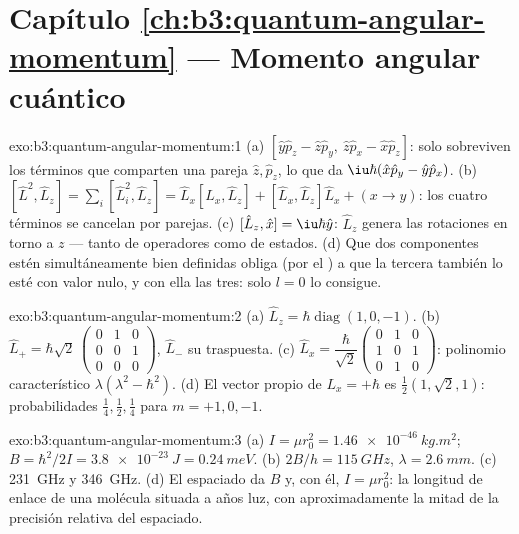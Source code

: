 \section*{Capítulo \ref{ch:b3:quantum-angular-momentum} --- Momento angular cuántico}

\begin{solution}{exo:b3:quantum-angular-momentum:1}
(a) $[\hat y\hat p_z - \hat z\hat p_y,\ \hat z\hat p_x - \hat x\hat
p_z]$: solo sobreviven los términos que comparten una pareja $\hat z, \hat p_z$,
lo que da $\iu\hbar(\hat x\hat p_y - \hat y\hat p_x)$. (b) $[\hat
L^2, \hat L_z] = \sum_i[\hat L_i^2, \hat L_z] = \hat L_x[\hat L_x,
\hat L_z] + [\hat L_x, \hat L_z]\hat L_x + (x \to y)$: los cuatro
términos se cancelan por parejas. (c) $[\hat L_z, \hat x] = \iu\hbar\hat y$:
$\hat L_z$ genera las rotaciones en torno a $z$ --- tanto de operadores como
de estados. (d) Que dos componentes estén simultáneamente bien definidas
obliga (por el ) a que la tercera también lo esté con valor nulo,
y con ella las tres: solo $l = 0$ lo consigue.
\end{solution}

\begin{solution}{exo:b3:quantum-angular-momentum:2}
(a) $\hat L_z = \hbar\operatorname{diag}(1, 0, -1)$. (b) $\hat L_+ =
\hbar\sqrt2\,\begin{pmatrix}0&1&0\\0&0&1\\0&0&0
\end{pmatrix}$, $\hat L_-$ su traspuesta. (c) $\hat L_x =
\dfrac{\hbar}{\sqrt2}\begin{pmatrix}0&1&0\\1&0&1\\0&1&0
\end{pmatrix}$: polinomio característico $\lambda(\lambda^2 -
\hbar^2)$. (d) El vector propio de $L_x = +\hbar$ es $\tfrac12(1,
\sqrt2, 1)$: probabilidades $\tfrac14, \tfrac12, \tfrac14$ para $m =
+1, 0, -1$.
\end{solution}

\begin{solution}{exo:b3:quantum-angular-momentum:3}
(a) $I = \mu r_0^2 = \qty{1.46e-46}{kg.m^2}$; $B = \hbar^2/2I =
\qty{3.8e-23}{J} = \qty{0.24}{meV}$. (b) $2B/h = \qty{115}{GHz}$,
$\lambda = \qty{2.6}{mm}$. (c) \qty{231}{GHz} y \qty{346}{GHz}.
(d) El espaciado da $B$ y, con él, $I = \mu r_0^2$: la longitud de enlace de
una molécula situada a años luz, con aproximadamente la mitad de la
precisión relativa del espaciado.
\end{solution}

